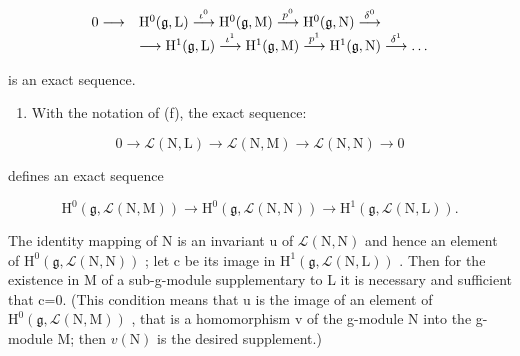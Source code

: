 \[
\begin{array}{r l} 0 \longrightarrow & \mathrm{H} ^ {0} (\mathfrak {g}, \mathrm{L}) \stackrel {{\iota ^ {0}}} {{\longrightarrow}} \mathrm{H} ^ {0} (\mathfrak {g}, \mathrm{M}) \stackrel {{p ^ {0}}} {{\longrightarrow}} \mathrm{H} ^ {0} (\mathfrak {g}, \mathrm{N}) \stackrel {{\delta^ {0}}} {{\longrightarrow}} \\ & \longrightarrow \mathrm{H} ^ {1} (\mathfrak {g}, \mathrm{L}) \stackrel {{\iota ^ {1}}} {{\longrightarrow}} \mathrm{H} ^ {1} (\mathfrak {g}, \mathrm{M}) \stackrel {{p ^ {1}}} {{\longrightarrow}} \mathrm{H} ^ {1} (\mathfrak {g}, \mathrm{N}) \stackrel {{\delta^ {1}}} {{\longrightarrow}} \dots \end{array}
\]

is an exact sequence.

\begin{enumerate}
\def\labelenumi{(\alph{enumi})}
\setcounter{enumi}{6}
\tightlist
\item
  With the notation of (f), the exact sequence:
\end{enumerate}

\[
0 \to \mathscr {L} (\mathrm{N}, \mathrm{L}) \to \mathscr {L} (\mathrm{N}, \mathrm{M}) \to \mathscr {L} (\mathrm{N}, \mathrm{N}) \to 0
\]

defines an exact sequence

\[
\mathrm{H} ^ {0} (\mathfrak {g}, \mathscr {L} (\mathrm{N}, \mathrm{M})) \rightarrow \mathrm{H} ^ {0} (\mathfrak {g}, \mathscr {L} (\mathrm{N}, \mathrm{N})) \rightarrow \mathrm{H} ^ {1} (\mathfrak {g}, \mathscr {L} (\mathrm{N}, \mathrm{L})).
\]

 The identity mapping of N is an invariant u of \(\mathcal{L}(\mathrm{N},\mathrm{N})\) and hence an element of \(\mathrm{H}^{0}(\mathfrak{g},\mathcal{L}(\mathrm{N},\mathrm{N}))\) ; let c be its image in \(\mathrm{H}^{1}(\mathfrak{g},\mathcal{L}(\mathrm{N},\mathrm{L}))\) . Then for the existence in M of a sub-g-module supplementary to L it is necessary and sufficient that c=0. (This condition means that u is the image of an element of \(\mathrm{H}^{0}(\mathfrak{g},\mathcal{L}(\mathrm{N},\mathrm{M}))\) , that is a homomorphism v of the g-module N into the g-module M; then \(v(\mathrm{N})\) is the desired supplement.)

